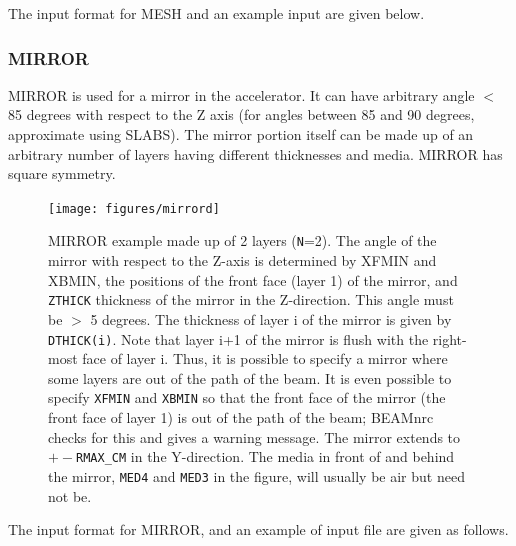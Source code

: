 \documentclass[12pt,twoside]{article}
\begin{document}
\clearpage

The input format for MESH and an example input are given below.
\begin{small}

\end{small}


\clearpage

\subsubsection{MIRROR}
\renewcommand{\rightmark}{MIRROR CM}

MIRROR is used for a mirror in the accelerator. It can have arbitrary
angle $<$ 85 degrees with respect to the Z axis (for angles between
85 and 90 degrees, approximate using SLABS).  The mirror portion itself can be
made up of an arbitrary
number
of layers having different thicknesses and media.  MIRROR has square symmetry.


\begin{figure}[htbp]
\begin{center}
\leavevmode
\mbox{}\hspace{0cm}
\texttt{[image: figures/mirrord]}
\caption[MIRROR CM geometry.]
{MIRROR example made up of 2 layers ({\tt N}=2).  The angle of the mirror with respect
to the Z-axis is determined by XFMIN and XBMIN, the positions of the
front face (layer 1) of the mirror, and {\tt ZTHICK} thickness of the
mirror in the Z-direction.  This angle must be $>$ 5 degrees.  The thickness of
layer i of the mirror is
given by {\tt DTHICK(i)}.  Note that layer i+1 of the mirror is flush with the
right-most face of layer i.  Thus, it is possible to specify a mirror
where some layers are out of the path of the beam.  It is even possible
to specify {\tt XFMIN} and {\tt XBMIN} so that the front face of the mirror (the
front face of layer 1) is out of the path of the beam; BEAMnrc checks for
this and gives a warning message.  The mirror extends to $+-${\tt RMAX\_CM} in
the Y-direction.  The media in front of and behind the mirror, {\tt MED4} and
{\tt MED3} in the figure, will usually be air but need not be.}
\label{fig_MIRRORD}
\end{center}
\end{figure}
\clearpage


The input format for MIRROR, and an example of input file are given as
follows.
\end{document}
